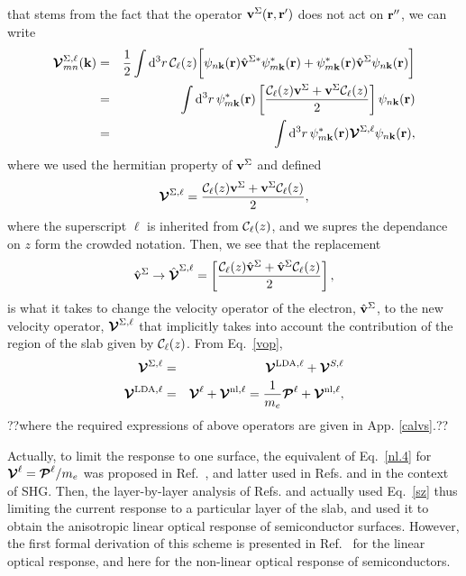 \documentclass[floatfix,prb,aps,superscriptaddress,11pt,preprint]{revtex4}
\begin{document}
that stems from the fact that the operator $\mathbf{v}^\Sigma(\mathbf{r},\mathbf{r}')$ does not act on
$\mathbf{r}''$, we can write
\begin{eqnarray}\label{nl.3}
\boldsymbol{\mathcal{\cal V}}^{\Sigma,\ell}_{mn}({\mathbf k})
&=&
\frac{1}{2}
\int \mathrm{d}^3 r\,
 {\mathbf{\cal C}}_\ell(z)
 \bigg[
\psi_{n\mathbf{k}}(\mathbf{r})
\hat{\mathbf{v}}^{\Sigma *}\psi^*_{m\mathbf{k}}(\mathbf{r})
+ 
\psi^*_{m\mathbf{k}}(\mathbf{r})\hat{\mathbf{v}}^\Sigma
\psi_{n\mathbf{k}}(\mathbf{r})
\bigg]
\nonumber\\
&=&
\int \mathrm{d}^3 r\,
\psi^*_{m\mathbf{k}}(\mathbf{r})
\left[\frac{{\mathbf{\cal C}}_\ell(z) \mathbf{v}^\Sigma +
\mathbf{v}^\Sigma {\mathbf{\cal C}}_\ell(z)}{2}\right]
\psi_{n\mathbf{k}}(\mathbf{r})
\nonumber\\
&=&
\int \mathrm{d}^3 r\,
\psi^*_{m\mathbf{k}}(\mathbf{r})
\boldsymbol{\mathcal{\cal V}}^{\Sigma,\ell}
\psi_{n\mathbf{k}}(\mathbf{r})
,
\end{eqnarray}
where we used the hermitian property of $\mathbf{v}^\Sigma$ and  defined
\begin{eqnarray}\label{nl.4}
\boldsymbol{\mathcal{\cal V}}^{\Sigma,\ell}
=
\frac{{\mathbf{\cal C}}_\ell(z) \mathbf{v}^\Sigma +
\mathbf{v}^\Sigma {\mathbf{\cal C}}_\ell(z)}{2}
,
\end{eqnarray} 
where the superscript $\ell$ is inherited from ${\mathbf{\cal C}}_\ell(z)$, and we
supres the dependance on $z$ form the crowded notation.  
Then,
we see that the replacement
\begin{equation}\label{vcali}
\hat{\mathbf{v}}^\Sigma \to \hat{\boldsymbol{\mathcal{\cal V}}}^{\Sigma,\ell}=\left[\frac{{\mathbf{\cal C}}_\ell(z) \hat{\mathbf{v}}^\Sigma +
\hat{\mathbf{v}}^\Sigma {\mathbf{\cal C}}_\ell(z)}{2}\right],
\end{equation} 
is what it takes to change the
velocity operator of the electron, $\hat{\mathbf{v}}^\Sigma$, to the new velocity
operator, $\boldsymbol{\mathcal{\cal V}}^{\Sigma,\ell}$
 that implicitly takes into account the
contribution of the region of the slab given by ${\mathbf{\cal C}}_\ell(z)$.
From Eq.~\eqref{vop},
\begin{eqnarray}\label{vopii}
\boldsymbol{\mathcal{\cal V}}^{\Sigma,\ell}
&=&
\boldsymbol{\mathcal{\cal V}}^{\mathrm{LDA},\ell}
+
\boldsymbol{\mathcal{\cal V}}^{S,\ell}
\nonumber\\
\boldsymbol{\mathcal{\cal V}}^{\mathrm{LDA},\ell}
&=&
\boldsymbol{\mathcal{\cal V}}^{\ell}
+
\boldsymbol{\mathcal{\cal V}}^{\mathrm{nl},\ell}
=
\frac{1}{m_e}
\boldsymbol{\mathcal{\cal P}}^{\ell}
+
\boldsymbol{\mathcal{\cal V}}^{\mathrm{nl},\ell}
,
\end{eqnarray}
??where the required expressions of above operators
are given in 
App. \ref{calvs}.??

Actually, 
to limit the response to one surface, 
the equivalent of Eq.~\eqref{nl.4} for $\boldsymbol{\mathcal{\cal V}}^\ell=\boldsymbol{\mathcal{\cal P}}^\ell/m_e$
 was proposed 
in Ref.~\cite{reining_microscopic_1994}, and latter used in Refs.
\cite{mendoza_ab_2001} 
and \cite{mejia_layer-by-layer_2004} in the context of SHG. Then, 
the layer-by-layer analysis of Refs. \cite{hogan_optical_2003} 
and \cite{castillo_layer-by-layer_2003}
actually used Eq.~\eqref{sz}
thus limiting the current response
to a particular layer of the slab, and used it to obtain the
anisotropic linear optical response of semiconductor surfaces.
However, the first formal derivation of this scheme is presented in
Ref.~\cite{mendoza_layer-by-layer_2006} for the linear optical response, and
here for the non-linear optical response of semiconductors.
\end{document}
